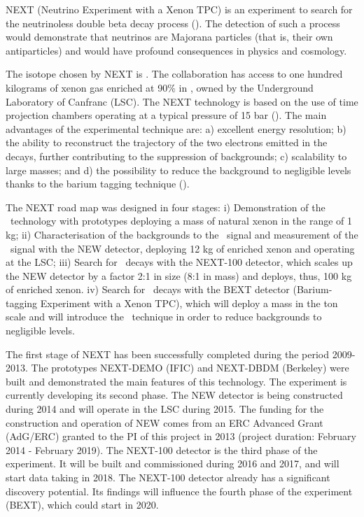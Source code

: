 
NEXT (Neutrino Experiment with a Xenon TPC) is an experiment to search for the neutrinoless double beta decay process (\bbonu). The detection of such a process would demonstrate that neutrinos are Majorana particles (that is, their own antiparticles) and would have profound consequences in physics and cosmology.  

The isotope chosen by NEXT is  \XE. The collaboration has access to one hundred kilograms of xenon gas enriched at 90\% in \XE, owned by the Underground Laboratory of Canfranc (LSC). The NEXT technology is based on the use of time projection chambers operating at a typical pressure of 15 bar (\HPXE). The main advantages of the experimental technique are: a) excellent energy resolution; b) the ability to reconstruct the trajectory of the two electrons emitted in the decays, further contributing to the suppression of backgrounds; c) scalability to large masses; and d) the possibility to reduce the background to negligible levels thanks to the barium tagging technique (\BATA).

The NEXT road map was designed in four stages: i) Demonstration of the \HPXE\ technology with prototypes deploying a mass of natural xenon in the range of 1 kg; ii) Characterisation of the backgrounds to the \bbonu\ signal and measurement of the \bbtnu\ signal with the NEW detector, deploying 12 kg of enriched xenon and operating at the LSC; iii) Search for \bbonu\ decays with the NEXT-100 detector, which scales up the NEW detector by a factor 2:1 in size (8:1 in mass) and deploys, thus, 100 kg of enriched xenon. iv) Search for \bbonu\ decays with the BEXT detector (Barium-tagging Experiment with a Xenon TPC), which will deploy a mass in the ton scale and will introduce the \BATA\ technique in order to reduce backgrounds to negligible levels.  

The first stage of NEXT has been successfully completed during the period 2009-2013. The prototypes NEXT-DEMO (IFIC) and NEXT-DBDM (Berkeley) were built and demonstrated the main features of this technology. The experiment is currently developing its second phase. The NEW detector is being constructed during 2014 and will operate in the LSC during 2015. The funding for the construction and operation of NEW comes from an ERC Advanced Grant (AdG/ERC) granted to the PI of this project in 2013 (project duration: February 2014 - February 2019). The NEXT-100 detector is the third phase of the experiment. It will be built and commissioned during 2016 and 2017, and will start data taking in 2018. The NEXT-100 detector already has a significant discovery potential. Its findings will influence the fourth phase of the experiment (BEXT), which could start in 2020. 

